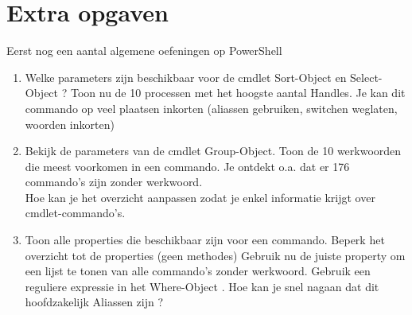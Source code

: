 \documentclass[11pt,a4paper]{report}
\begin{document}
\section{Extra opgaven}

Eerst nog een aantal algemene oefeningen op PowerShell
\begin{enumerate}[resume]
	\item Welke parameters zijn beschikbaar voor de cmdlet Sort-Object en Select-Object ?
	Toon nu de 10 processen met het hoogste aantal Handles. Je kan dit commando op veel plaatsen inkorten (aliassen gebruiken, switchen weglaten, woorden inkorten)
	\item Bekijk de parameters van de cmdlet Group-Object.
	Toon de 10 werkwoorden die meest voorkomen in een commando. Je ontdekt o.a. dat er 176 commando's zijn zonder werkwoord.
	\\Hoe kan je het overzicht aanpassen zodat je enkel informatie krijgt over cmdlet-commando's.
	\item Toon alle properties die beschikbaar zijn voor een commando. Beperk het overzicht tot de properties (geen methodes)
	Gebruik nu de juiste property om een lijst te tonen van alle commando's zonder werkwoord. Gebruik een reguliere expressie in het Where-Object .
	Hoe kan je snel nagaan dat dit hoofdzakelijk Aliassen zijn ?
\end{enumerate}
\end{document}
